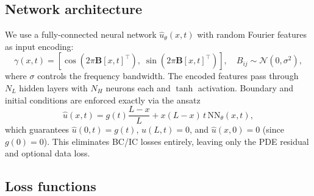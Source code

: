 \documentclass[11pt]{article}
\begin{document}
\subsection{Network architecture}

We use a fully-connected neural network $\hat{u}_\theta(x, t)$ with random Fourier features \cite{tancik2020fourier,wang2021eigenvector} as input encoding:
\begin{equation}
\gamma(x, t) = \left[\cos(2\pi \bm{B} [x, t]^\top),\; \sin(2\pi \bm{B} [x, t]^\top)\right], \quad B_{ij} \sim \mathcal{N}(0, \sigma^2),
\end{equation}
where $\sigma$ controls the frequency bandwidth. The encoded features pass through $N_L$ hidden layers with $N_H$ neurons each and $\tanh$ activation. Boundary and initial conditions are enforced exactly via the ansatz
\begin{equation}
\label{eq:hard_bc}
\hat{u}(x, t) = g(t)\frac{L-x}{L} + x(L-x)\,t\,\mathrm{NN}_\theta(x, t),
\end{equation}
which guarantees $\hat{u}(0,t) = g(t)$, $\hat{u}(L,t) = 0$, and $\hat{u}(x,0) = 0$ (since $g(0) = 0$). This eliminates BC/IC losses entirely, leaving only the PDE residual and optional data loss.

\subsection{Loss functions}
\end{document}
